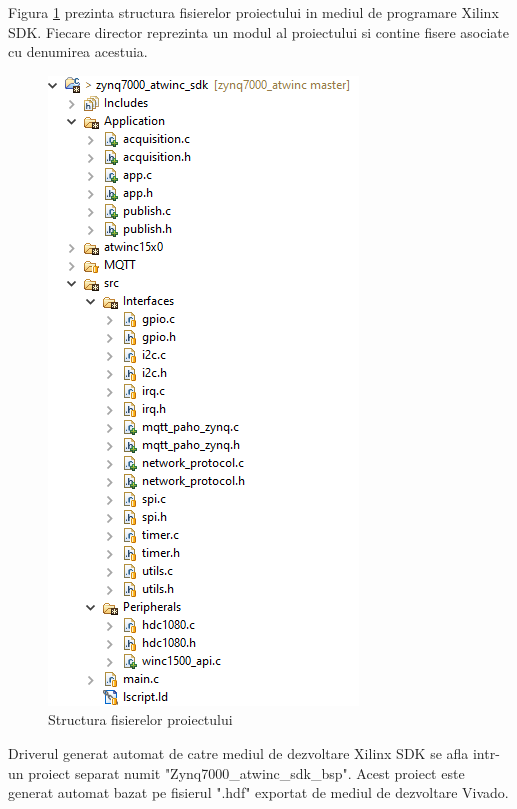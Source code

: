 Figura \ref{fig:PI_SDKFileStructure} prezinta structura fisierelor proiectului in mediul de programare Xilinx SDK. Fiecare director reprezinta un modul al proiectului 
si contine fisere asociate cu denumirea acestuia.
\begin{figure}[H]
    \centering
    \includegraphics[scale=0.66]{figs/PI_SDKFileStructure.png}
    \caption{Structura fisierelor proiectului}
    \label{fig:PI_SDKFileStructure}
\end{figure}

Driverul generat automat de catre mediul de dezvoltare Xilinx SDK se afla intr-un proiect separat numit "Zynq7000\_atwinc\_sdk\_bsp". Acest proiect este generat automat 
bazat pe fisierul ".hdf" exportat de mediul de dezvoltare Vivado.

